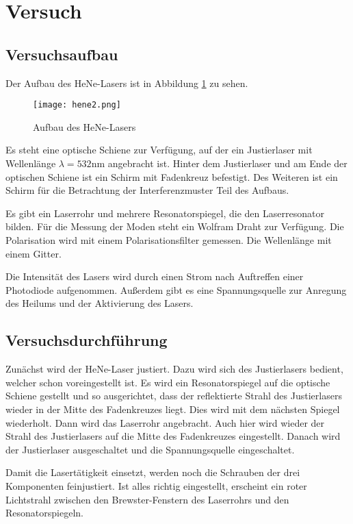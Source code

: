 \section{Versuch}
\subsection{Versuchsaufbau}
Der Aufbau des HeNe-Lasers ist in Abbildung \ref{fig:hene2} zu sehen.

\begin{figure}
	\centering
	\texttt{[image: hene2.png]}
	\caption{Aufbau des HeNe-Lasers}
	\label{fig:hene2}
\end{figure}

\noindent Es steht eine optische Schiene zur Verfügung, auf der ein Justierlaser mit Wellenlänge \(\lambda=532\)nm angebracht ist. Hinter dem Justierlaser und am Ende der optischen Schiene ist ein Schirm mit Fadenkreuz befestigt. Des Weiteren ist ein Schirm für die Betrachtung der Interferenzmuster Teil des Aufbaus.

\noindent Es gibt ein Laserrohr und mehrere Resonatorspiegel, die den Laserresonator bilden. Für die Messung der Moden steht ein Wolfram Draht zur Verfügung. Die Polarisation wird mit einem Polarisationsfilter gemessen. Die Wellenlänge mit einem Gitter.

\noindent Die Intensität des Lasers wird durch einen Strom nach Auftreffen einer Photodiode aufgenommen. Außerdem gibt es eine Spannungsquelle zur Anregung des Heilums und der Aktivierung des Lasers.

\subsection{Versuchsdurchführung}
Zunächst wird der HeNe-Laser justiert. Dazu wird sich des Justierlasers bedient, welcher schon voreingestellt ist. Es wird ein Resonatorspiegel auf die optische Schiene gestellt und so ausgerichtet, dass der reflektierte Strahl des Justierlasers wieder in der Mitte des Fadenkreuzes liegt. Dies wird mit dem nächsten Spiegel wiederholt. Dann wird das Laserrohr angebracht. Auch hier wird wieder der Strahl des Justierlasers auf die Mitte des Fadenkreuzes eingestellt. Danach wird der Justierlaser ausgeschaltet und die Spannungsquelle eingeschaltet.

\noindent Damit die Lasertätigkeit einsetzt, werden noch die Schrauben der drei Komponenten feinjustiert. Ist alles richtig eingestellt, erscheint ein roter Lichtstrahl zwischen den Brewster-Fenstern des Laserrohrs und den Resonatorspiegeln.

